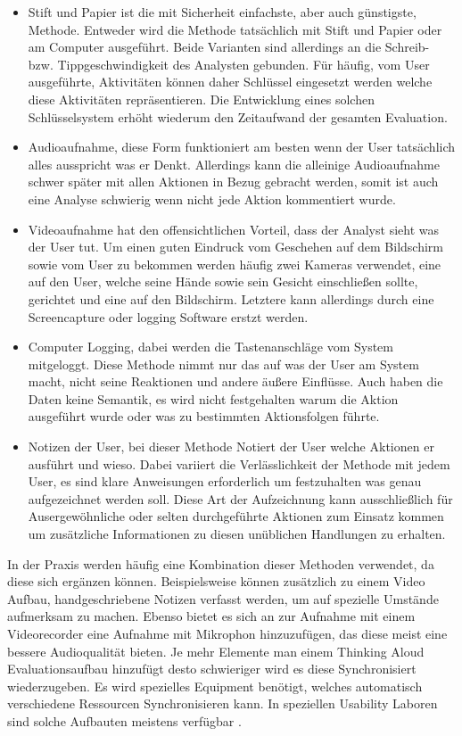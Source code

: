 \documentclass[draft=false
              ,paper=a4
              ,twoside=false
              ,fontsize=11pt
              ,headsepline
              ,BCOR10mm
              ,DIV11
              ]{scrbook}
\begin{document}
\begin{itemize}
  \item Stift und Papier ist die mit Sicherheit einfachste, aber auch günstigste, Methode. Entweder wird die Methode tatsächlich mit Stift und Papier oder am Computer ausgeführt. Beide Varianten sind allerdings an die Schreib- bzw. Tippgeschwindigkeit des Analysten gebunden. Für häufig, vom User ausgeführte, Aktivitäten können daher Schlüssel eingesetzt werden welche diese Aktivitäten repräsentieren. Die Entwicklung eines solchen Schlüsselsystem erhöht wiederum den Zeitaufwand der gesamten Evaluation.
  \item Audioaufnahme, diese Form funktioniert am besten wenn der User tatsächlich alles ausspricht was er Denkt. Allerdings kann die alleinige Audioaufnahme schwer später mit allen Aktionen in Bezug gebracht werden, somit ist auch eine Analyse schwierig wenn nicht jede Aktion kommentiert wurde.
  \item Videoaufnahme hat den offensichtlichen Vorteil, dass der Analyst sieht was der User tut. Um einen guten Eindruck vom Geschehen auf dem Bildschirm sowie vom User zu bekommen werden häufig zwei Kameras verwendet, eine auf den User, welche seine Hände sowie sein Gesicht einschließen sollte, gerichtet und eine auf den Bildschirm. Letztere kann allerdings durch eine Screencapture oder logging Software erstzt werden. 
  \item Computer Logging, dabei werden die Tastenanschläge vom System mitgeloggt. Diese Methode nimmt nur das auf was der User am System macht, nicht seine Reaktionen und andere äußere Einflüsse. Auch haben die Daten keine Semantik, es wird nicht festgehalten warum die Aktion ausgeführt wurde oder was zu bestimmten Aktionsfolgen führte. 
  \item Notizen der User, bei dieser Methode Notiert der User welche Aktionen er ausführt und wieso. Dabei variiert die Verlässlichkeit der Methode mit jedem User, es sind klare Anweisungen erforderlich um festzuhalten was genau aufgezeichnet werden soll. Diese Art der Aufzeichnung kann ausschließlich für Ausergewöhnliche oder selten durchgeführte Aktionen zum Einsatz kommen um zusätzliche Informationen zu diesen unüblichen Handlungen zu erhalten.
\end{itemize}

In der Praxis werden häufig eine Kombination dieser Methoden verwendet, da diese sich ergänzen können. Beispielsweise können zusätzlich zu einem Video Aufbau, handgeschriebene Notizen verfasst werden, um auf spezielle Umstände aufmerksam zu machen. Ebenso bietet es sich an zur Aufnahme mit einem Videorecorder eine Aufnahme mit Mikrophon hinzuzufügen, das diese meist eine bessere Audioqualität bieten. Je mehr Elemente man einem Thinking Aloud Evaluationsaufbau hinzufügt desto schwieriger wird es diese Synchronisiert wiederzugeben. Es wird spezielles Equipment benötigt, welches automatisch verschiedene Ressourcen Synchronisieren kann. In speziellen Usability Laboren sind solche Aufbauten meistens verfügbar \cite{nielsen_usability_1994}.
\end{document}
